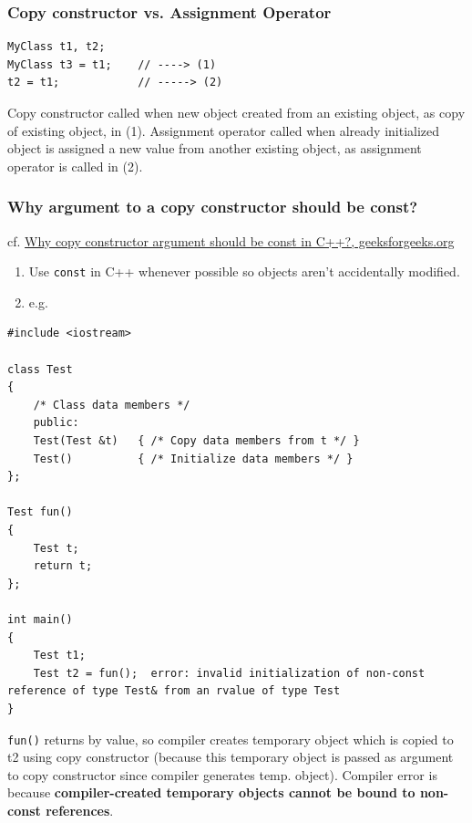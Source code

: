 \documentclass[10pt]{amsart}
\begin{document}
\begin{multicols*}{2}
\subsubsection{Copy constructor vs. Assignment Operator}  

\begin{lstlisting}  
MyClass t1, t2; 
MyClass t3 = t1; 	// ----> (1)
t2 = t1; 			// -----> (2)
\end{lstlisting}

Copy constructor called when new object created from an existing object, as copy of existing object, in (1).  
Assignment operator called when already initialized object is assigned a new value from another existing object, as assignment operator is called in (2).  

\subsubsection{Why argument to a copy constructor should be const?  } 

cf. \href{http://www.geeksforgeeks.org/copy-constructor-argument-const/}{Why copy constructor argument should be const in C++?, geeksforgeeks.org}

\begin{enumerate}
\item Use \verb|const| in C++ whenever possible so objects aren't accidentally modified.  
\item e.g.  
\end{enumerate}

\begin{lstlisting}  
#include <iostream>  

class Test
{
	/* Class data members */
	public:
	Test(Test &t) 	{ /* Copy data members from t */ } 
	Test()			{ /* Initialize data members */ }
};

Test fun() 
{
	Test t;
	return t;
};

int main()
{
	Test t1;
	Test t2 = fun();  error: invalid initialization of non-const reference of type Test& from an rvalue of type Test
}
\end{lstlisting}

\verb|fun()| returns by value, so compiler creates temporary object which is copied to t2 using copy constructor (because this temporary object is passed as argument to copy constructor since compiler generates temp. object).  
Compiler error is because \textbf{compiler-created temporary objects cannot be bound to non-const references}. 




\end{multicols*}
\end{document}
